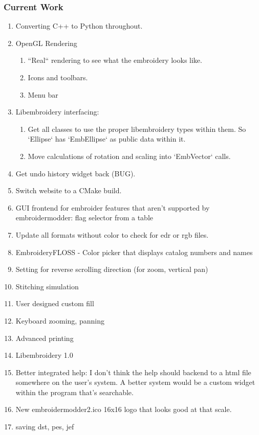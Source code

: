 \documentclass[a4paper, 11pt]{report}
\begin{document}
\subsubsection{Current Work}

\begin{enumerate}
\item Converting C++ to Python throughout.
\item OpenGL Rendering
\begin{enumerate}
\item ``Real`` rendering to see what the embroidery looks like.
\item Icons and toolbars.
\item Menu bar
\end{enumerate}
\item Libembroidery interfacing:
\begin{enumerate}
\item Get all classes to use the proper libembroidery types within them.
       So `Ellipse` has `EmbEllipse` as public data within it.
\item Move calculations of rotation and scaling into `EmbVector` calls.
\end{enumerate}
\item Get undo history widget back (BUG).
\item Switch website to a CMake build.
\item GUI frontend for embroider features that aren't supported by embroidermodder: flag selector from a table
\item Update all formats without color to check for edr or rgb files.
\item EmbroideryFLOSS - Color picker that displays catalog numbers and names
\item Setting for reverse scrolling direction (for zoom, vertical pan)
\item Stitching simulation
\item User designed custom fill
\item Keyboard zooming, panning
\item Advanced printing
\item Libembroidery 1.0
\item Better integrated help: I don't think the help should backend to a html file somewhere on the user's system. A better system would be a custom widget within the program that's searchable.
\item New embroidermodder2.ico 16x16 logo that looks good at that scale.
\item saving dst, pes, jef

\end{enumerate}
\end{document}
